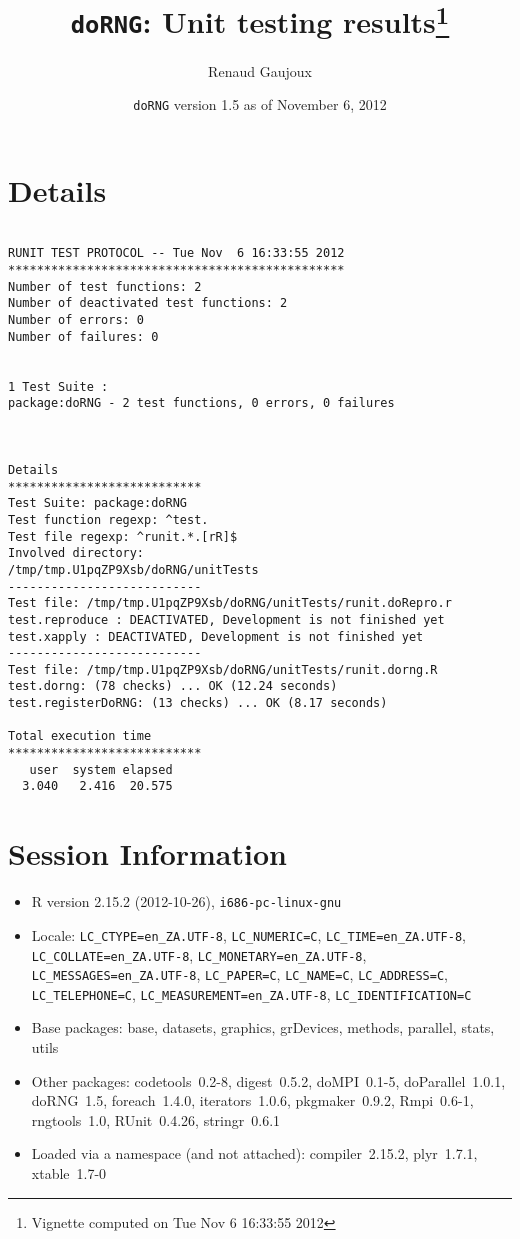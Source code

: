 \documentclass[10pt]{article}
\author{Renaud Gaujoux}
\title{\texttt{doRNG}: Unit testing results\footnote{Vignette computed  on Tue Nov  6 16:33:55 2012}}
\date{\texttt{doRNG} version 1.5 as of November  6, 2012}
\begin{document}
\maketitle

\section{Details}
\begin{verbatim}

RUNIT TEST PROTOCOL -- Tue Nov  6 16:33:55 2012 
*********************************************** 
Number of test functions: 2 
Number of deactivated test functions: 2 
Number of errors: 0 
Number of failures: 0 

 
1 Test Suite : 
package:doRNG - 2 test functions, 0 errors, 0 failures



Details 
*************************** 
Test Suite: package:doRNG 
Test function regexp: ^test. 
Test file regexp: ^runit.*.[rR]$ 
Involved directory: 
/tmp/tmp.U1pqZP9Xsb/doRNG/unitTests 
--------------------------- 
Test file: /tmp/tmp.U1pqZP9Xsb/doRNG/unitTests/runit.doRepro.r 
test.reproduce : DEACTIVATED, Development is not finished yet
test.xapply : DEACTIVATED, Development is not finished yet
--------------------------- 
Test file: /tmp/tmp.U1pqZP9Xsb/doRNG/unitTests/runit.dorng.R 
test.dorng: (78 checks) ... OK (12.24 seconds)
test.registerDoRNG: (13 checks) ... OK (8.17 seconds)

Total execution time
***************************
   user  system elapsed 
  3.040   2.416  20.575 

\end{verbatim}

\section*{Session Information}
\begin{itemize}\raggedright
  \item R version 2.15.2 (2012-10-26), \verb|i686-pc-linux-gnu|
  \item Locale: \verb|LC_CTYPE=en_ZA.UTF-8|, \verb|LC_NUMERIC=C|, \verb|LC_TIME=en_ZA.UTF-8|, \verb|LC_COLLATE=en_ZA.UTF-8|, \verb|LC_MONETARY=en_ZA.UTF-8|, \verb|LC_MESSAGES=en_ZA.UTF-8|, \verb|LC_PAPER=C|, \verb|LC_NAME=C|, \verb|LC_ADDRESS=C|, \verb|LC_TELEPHONE=C|, \verb|LC_MEASUREMENT=en_ZA.UTF-8|, \verb|LC_IDENTIFICATION=C|
  \item Base packages: base, datasets, graphics, grDevices, methods,
    parallel, stats, utils
  \item Other packages: codetools~0.2-8, digest~0.5.2, doMPI~0.1-5,
    doParallel~1.0.1, doRNG~1.5, foreach~1.4.0, iterators~1.0.6,
    pkgmaker~0.9.2, Rmpi~0.6-1, rngtools~1.0, RUnit~0.4.26,
    stringr~0.6.1
  \item Loaded via a namespace (and not attached): compiler~2.15.2,
    plyr~1.7.1, xtable~1.7-0
\end{itemize}
\end{document}
